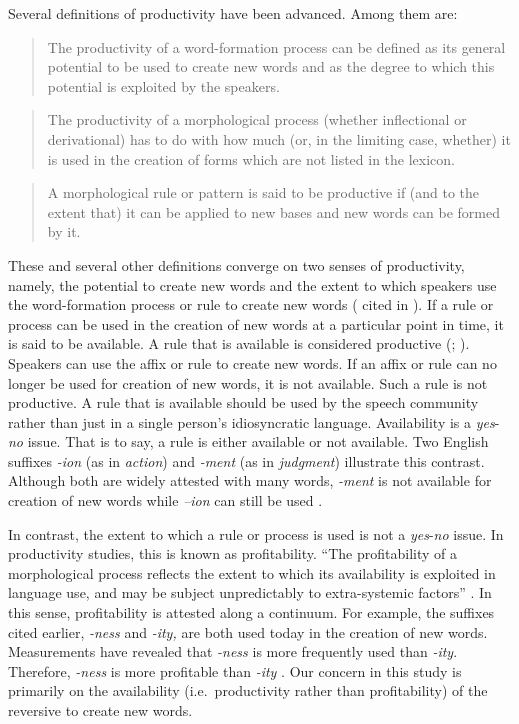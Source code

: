 \documentclass[output=paper]{langsci/langscibook}
\begin{document}
Several definitions of productivity have been advanced. Among them are: 

\begin{quote}
The productivity of a word-formation process can be defined as its general potential to be used to create new words and as the degree to which this potential is exploited by the speakers. \citep[127]{Plag2006}
\end{quote}

\begin{quote}
The productivity of a morphological process (whether inflectional or derivational) has to do with how much (or, in the limiting case, whether) it is used in the creation of forms which are not listed in the lexicon. \citep[315]{Bauer2005}
\end{quote}

\begin{quote}
A morphological rule or pattern is said to be productive if (and to the extent that) it can be applied to new bases and new words can be formed by it. \citep[114]{HaspelmathSims2010}
\end{quote}

These and several other definitions converge on two senses of productivity, namely, the potential to create new words and the extent to which speakers use the word-forma\-tion process or rule to create new words (\citealt{Corbin1987} cited in \citealt{Bauer2001}). If a rule or process can be used in the creation of new words at a particular point in time, it is said to be available. A rule that is available is considered productive (\citealt[205]{Bauer2001}; \citealt{Plag2006}). Speakers can use the affix or rule to create new words. If an affix or rule can no longer be used for creation of new words, it is not available. Such a rule is not productive. A rule that is available should be used by the speech community rather than just in a single person’s idiosyncratic language. Availability is a \textit{yes}-\textit{no} issue. That is to say, a rule is either available or not available. Two English suffixes \textit{-ion} (as in \textit{action}) and \textit{-ment} (as in \textit{judgment}) illustrate this contrast. Although both are widely attested with many words, \textit{-ment} is not available for creation of new words while \textit{–ion} can still be used \citep{Bauer2001}. 

In contrast, the extent to which a rule or process is used is not a \textit{yes}-\textit{no} issue. In productivity studies, this is known as profitability. “The profitability of a morphological process reflects the extent to which its availability is exploited in language use, and may be subject unpredictably to extra-systemic factors” \citep[211]{Bauer2001}. In this sense, profitability is attested along a continuum. For example, the suffixes cited earlier, \textit{-ness} and \textit{-ity,} are both used today in the creation of new words. Measurements have revealed that \textit{-ness} is more frequently used than \textit{-ity}. Therefore, \textit{-ness} is more profitable than \textit{-ity} \citep{Plag2006}. Our concern in this study is primarily on the availability (i.e.\ productivity rather than profitability) of the reversive to create new words. 
\end{document}
